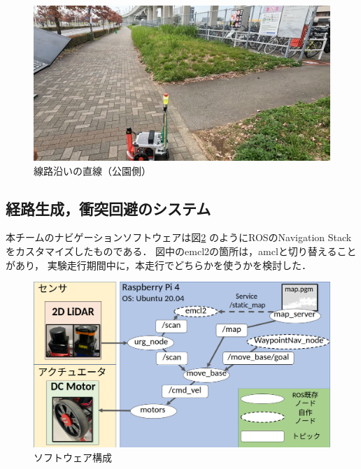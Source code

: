 \documentclass[twocolumn,9pt]{jsproceedings}
\begin{document}
\begin{figure}[h]
  \begin{center}
    \includegraphics[width=1.0\linewidth]{figs/park_side_alley.pdf}
	  \caption{線路沿いの直線（公園側）}
    \label{fig:park_side_alley}
  \end{center}
\end{figure}

\subsection{経路生成，衝突回避のシステム}

本チームのナビゲーションソフトウェアは図\ref{fig:software}
のようにROSのNavigation Stackをカスタマイズしたものである．
図中のemcl2の箇所は，amclと切り替えることがあり，
実験走行期間中に，本走行でどちらかを使うかを検討した．

\begin{figure}[h]
  \begin{center}
    \includegraphics[width=1.0\linewidth]{figs/software.pdf}
    \caption{ソフトウェア構成}
    \label{fig:software}
  \end{center}
\end{figure}
\end{document}
